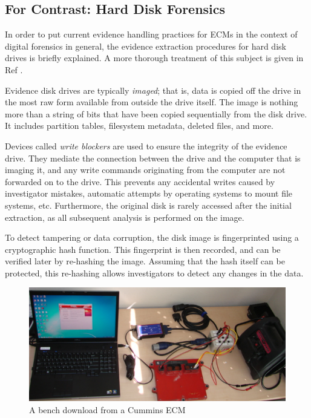 \subsection{For Contrast: Hard Disk Forensics}

In order to put current evidence handling practices for ECMs in the context of digital forensics in general, the evidence extraction
procedures for hard disk drives is briefly explained. A more thorough treatment of this subject is given in Ref \cite{carrier2005}.

Evidence disk drives are typically \emph{imaged}; that is, data is copied off the drive in the most raw form available from outside
the drive itself. The image is nothing more than a string of bits that have been copied sequentially from the disk drive. It includes
partition tables, filesystem metadata, deleted files, and more.

Devices called \emph{write blockers} are used to ensure the integrity of the evidence drive\cite{carrier2005}. They mediate the connection between the
drive and the computer that is imaging it, and any write commands originating from the computer are not forwarded on to the drive.
This prevents any accidental writes caused by investigator mistakes, automatic attempts by operating systems to mount file systems, etc.
Furthermore, the original disk is rarely accessed after the initial extraction, as all subsequent analysis is performed on the image.

To detect tampering or data corruption, the disk image is fingerprinted using a cryptographic hash function. This fingerprint is then recorded,
and can be verified later by re-hashing the image. Assuming that the hash itself can be protected, this re-hashing allows investigators to
detect any changes in the data.

\begin{figure}[h]

  \includegraphics[scale=0.5]{cumminsbench}
  \caption{A bench download from a Cummins ECM}
  \label{fig:cumminsbench}
\end{figure}

